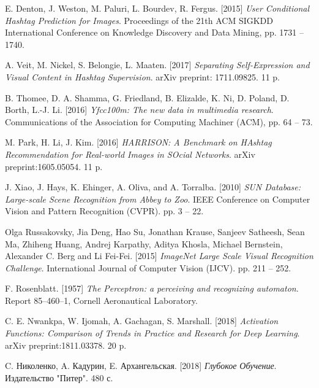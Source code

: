 \begin{thebibliography}{99}

	\bigskip
	
     E. Denton, J. Weston, M. Paluri, L. Bourdev, R. Fergus. [2015]
     \textit{User Conditional Hashtag Prediction for Images}.
     Proceedings of the 21th ACM SIGKDD International Conference 
     on Knowledge Discovery and Data Mining,
     pp. 1731 -- 1740.
     
      A. Veit, M. Nickel, S. Belongie, L. Maaten. [2017]
      \textit{Separating Self-Expression and Visual Content in Hashtag Supervision}.
      arXiv preprint: 1711.09825.
      11 p.
      
     B. Thomee, D. A. Shamma, G. Friedland, B. Elizalde, K. Ni,
     D. Poland, D. Borth, L.-J. Li. [2016]
     \textit{Yfcc100m: The new data in multimedia research}.
     Communications of the Association for Computing Machiner (ACM),
     pp. 64 -- 73.
        
     M. Park, H. Li, J. Kim. [2016]
     \textit{HARRISON: A Benchmark on HAshtag Recommendation
     for Real-world Images in SOcial Networks}.
     arXiv preprint:1605.05054.
     11 p.
     
	 J. Xiao, J. Hays, K. Ehinger, A. Oliva, and A. Torralba. [2010]
	 \textit{SUN Database: Large-scale Scene Recognition from Abbey to Zoo}.
	 IEEE Conference on Computer Vision and Pattern Recognition (CVPR).
	 pp. 3 -- 22.
     
     Olga Russakovsky, Jia Deng, Hao Su, Jonathan Krause, Sanjeev Satheesh, 
     Sean Ma, Zhiheng Huang, Andrej Karpathy, Aditya Khosla, Michael Bernstein, 
     Alexander C. Berg and Li Fei-Fei. [2015]
     \textit{ImageNet Large Scale Visual Recognition Challenge}. 
     International Journal of Computer Vision (IJCV).
     pp. 211 -- 252.
     
     F. Rosenblatt. [1957]
     \textit{The Perceptron: a perceiving and recognizing automaton}.
     Report 85–460–1, Cornell Aeronautical Laboratory.
     
     C. E. Nwankpa, W. Ijomah, A. Gachagan, S. Marshall. [2018]
     \textit{Activation Functions: Comparison of Trends in
     Practice and Research for Deep Learning}.
     arXiv preprint:1811.03378.
     20 p.
     
     C. Николенко, A. Кадурин, E. Архангельская. [2018]
     \textit{Глубокое Обучение}.
     Издательство "Питер".
     480 с.
     

\end{thebibliography}
